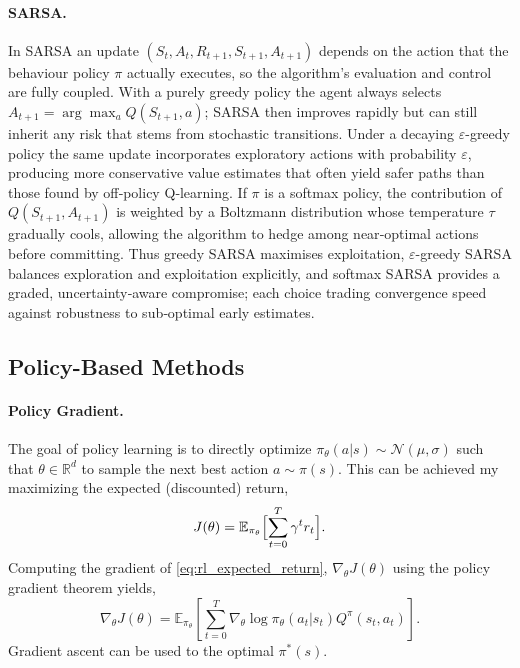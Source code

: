 \paragraph{SARSA.}

In \ac{SARSA} an update $(S_t, A_t, R_{t + 1}, S_{t + 1}, A_{t + 1})$ depends on the action that the behaviour policy $\pi$ actually executes, so the algorithm's evaluation and control are fully coupled. With a purely greedy policy the agent always selects $A_{t+1}=\arg\max_a Q(S_{t+1},a)$; \ac{SARSA} then improves rapidly but can still inherit any risk that stems from stochastic transitions. Under a decaying $\varepsilon$-greedy policy the same update incorporates exploratory actions with probability $\varepsilon$, producing more conservative value estimates that often yield safer paths than those found by off‑policy Q‑learning. If $\pi$ is a softmax policy, the contribution of $Q(S_{t+1},A_{t+1})$ is weighted by a Boltzmann distribution whose temperature $\tau$ gradually cools, allowing the algorithm to hedge among near‑optimal actions before committing. Thus greedy \ac{SARSA} maximises exploitation, $\varepsilon$-greedy \ac{SARSA} balances exploration and exploitation explicitly, and softmax \ac{SARSA} provides a graded, uncertainty‑aware compromise; each choice trading convergence speed against robustness to sub‑optimal early estimates.

\subsection{Policy-Based Methods}



\paragraph{Policy Gradient.}

The goal of policy learning is to directly optimize $\pi_{\theta}(a|s) \sim \mathcal N(\mu, \sigma)$ such that $\theta \in \mathbb R^d$ to sample the next best action $a \sim \pi(s)$. This can be achieved my maximizing the expected (discounted) return,
\begin{equation} 
J(\theta)=\mathbb{E}_{\pi_{\theta}}\Bigl[\sum_{t=0}^T\gamma^t r_t\Bigr]. 
\label{eq:rl_expected_return}
\end{equation}
Computing the gradient of \cref{eq:rl_expected_return}, $\nabla_{\theta}J(\theta)$ using the policy gradient theorem yields,
$$
\nabla_{\theta}J(\theta) = \mathbb E_{\pi_{\theta}}\left[\sum_{t=0}^T \nabla_{\theta}\log \pi_{\theta}(a_t|s_t)Q^{\pi}(s_t,a_t)\right].
$$
Gradient ascent can be used to the optimal $\pi^*(s)$.

